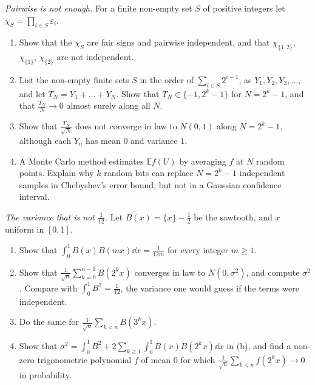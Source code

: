\begin{exercise}[$\star$]\label{pb:pairwisebits}
\emph{Pairwise is not enough.} For a finite non-empty set $S$ of positive integers let $\chi_S=\prod_{i\in S}\varepsilon_i$.
\begin{enumerate}[label=(\alph*)]
\item Show that the $\chi_S$ are fair signs and pairwise independent, and that $\chi_{\{1,2\}}$, $\chi_{\{1\}}$, $\chi_{\{2\}}$ are not independent.
\item List the non-empty finite sets $S$ in the order of $\sum_{i\in S}2^{i-1}$, as $Y_1,Y_2,Y_3,\dots$, and let $T_N=Y_1+\dots+Y_N$. Show that $T_N\in\{-1,2^k-1\}$ for
$N=2^k-1$, and that $\frac{T_N}N\to0$ almost surely along all $N$.
\item Show that $\frac{T_N}{\sqrt N}$ does not converge in law to $N(0,1)$ along $N=2^k-1$, although each $Y_n$ has mean $0$ and variance $1$.
\item A Monte Carlo method estimates $\mathbb Ef(U)$ by averaging $f$ at $N$ random points. Explain why $k$ random bits can replace $N=2^k-1$ independent
samples in Chebyshev's error bound, but not in a Gaussian confidence interval.
\end{enumerate}
\end{exercise}

\begin{exercise}[$\star\star$]\label{pb:sawtooth}
\emph{The variance that is not $\frac1{12}$.} Let $B(x)=\{x\}-\frac12$ be the sawtooth, and $x$ uniform in $[0,1]$.
\begin{enumerate}[label=(\alph*)]
\item Show that $\int_0^1B(x)B(mx)\dd x=\frac1{12m}$ for every integer $m\ge1$.
\item Show that $\frac1{\sqrt n}\sum_{k=0}^{n-1}B(2^kx)$ converges in law to $N(0,\sigma^2)$, and compute $\sigma^2$. Compare with $\int_0^1B^2=\frac1{12}$, the variance one
would guess if the terms were independent.
\item Do the same for $\frac1{\sqrt n}\sum_{k<n}B(3^kx)$.
\item Show that $\sigma^2=\int_0^1B^2+2\sum_{k\ge1}\int_0^1B(x)B(2^kx)\dd x$ in (b), and find a non-zero trigonometric polynomial $f$ of mean $0$ for which
$\frac1{\sqrt n}\sum_{k<n}f(2^kx)\to0$ in probability.
\end{enumerate}
\end{exercise}

